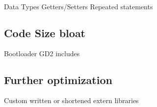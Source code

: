Data Types
Getters/Setters
Repeated statements

\subsection{Code Size bloat}
Bootloader
GD2
includes

\subsection{Further optimization}
Custom written or shortened extern libraries



